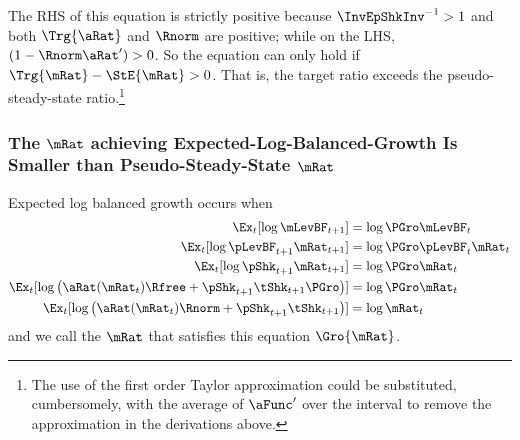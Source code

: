 \documentclass[\econtexRoot/BufferStockTheory]{subfiles}
\begin{document}
The RHS of this equation is strictly positive because $\InvEpShkInv^{-1}>1$ and both $\Trg{\aRat}$ and $\Rnorm$ are positive; while on the LHS, $(1-\Rnorm\aRat^{\prime})>0$.  So the equation can only hold if $\Trg{\mRat}-\StE{\mRat} > 0$.  That is, the target ratio exceeds the pseudo-steady-state ratio.\footnote{The use of the first order Taylor approximation could be substituted, cumbersomely, with the average of $\aFunc^{\prime}$ over the interval to remove the approximation in the derivations above.}

\subsubsection{The $\mRat$  achieving Expected-Log-Balanced-Growth Is Smaller than Pseudo-Steady-State $\mRat$}

Expected log balanced growth occurs when
\begin{equation}\begin{split}
    \Ex_{t}[\log \mLevBF_{t+1}] & = \log \PGro \mLevBF_{t}
\\      \Ex_{t}[\log \pLevBF_{t+1}\mRat_{t+1}] & = \log \PGro \pLevBF_{t} \mRat_{t}
\\      \Ex_{t}[\log \pShk_{t+1}\mRat_{t+1}] & = \log \PGro \mRat_{t}
\\      \Ex_{t}[\log \left(\aRat(\mRat_{t})\Rfree+\pShk_{t+1}\tShk_{t+1}\PGro\right)] & = \log \PGro \mRat_{t}
\\      \Ex_{t}[\log \left(\aRat(\mRat_{t})\Rnorm+\pShk_{t+1}\tShk_{t+1}\right)] & = \log \mRat_{t}
\end{split}\end{equation}
and we call the $\mRat$ that satisfies this equation $\Gro{\mRat}$.
\end{document}
